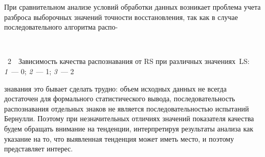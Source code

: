 \begin{multicols}{2}
      При сравнительном анализе условий обработки данных возникает проблема учета разброса 
выборочных значений точности восстановления, так как в случае последовательного алгоритма 
распо-\linebreak\vspace*{-12pt}
\pagebreak

\begin{center} %
\vspace*{3pt}
\mbox{%
\epsfxsize=78.652mm %
}
\end{center}
\vspace*{4pt}
{{\figurename~2}\ \ \small{Зависимость качества распознавания от RS при различных значениях~LS: \textit{1}~--- 
0; \textit{2}~--- 1; \textit{3}~--- 2}}
\vspace*{9pt}

\bigskip
\addtocounter{figure}{1}


\noindent
знавания это бывает сделать трудно: объем исходных данных не всегда достаточен для 
формального статистического вывода, последовательность рас\-позна\-вания отдельных знаков не 
является последовательностью испытаний Бернулли. Поэтому при незначительных отличиях 
значений показателя качества будем обращать внимание на тенденции,
интерпретируя результаты 
анализа как указание на то,
что выявленная тенденция может иметь место, и поэтому представляет 
интерес. 
      

\end{multicols}
